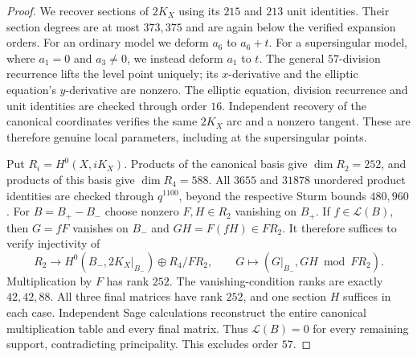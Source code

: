 \begin{proof}
We recover sections of $2K_X$ using its $215$ and $213$ unit
identities. Their section degrees are at most $373,375$ and are
again below the verified expansion orders.
For an ordinary model we deform $a_6$ to $a_6+t$.
For a supersingular model, where $a_1=0$ and $a_3\ne0$, we
instead deform $a_1$ to $t$.
The general $57$-division recurrence lifts the level point
uniquely; its $x$-derivative and the elliptic equation's
$y$-derivative are nonzero.
The elliptic equation, division recurrence and unit identities
are checked through order $16$.
Independent recovery of the canonical coordinates verifies the
same $2K_X$ arc and a nonzero tangent. These are therefore genuine
local parameters, including at the supersingular points.

Put $R_i=H^0(X,iK_X)$. Products of the canonical basis give
$\dim R_2=252$, and products of this basis give $\dim R_4=588$.
All $3655$ and $31878$ unordered product identities are checked
through $q^{1100}$, beyond the respective Sturm bounds $480,960$.
For $B=B_+-B_-$ choose nonzero $F,H\in R_2$ vanishing on $B_+$.
If $f\in\mathcal L(B)$, then $G=fF$ vanishes on $B_-$ and
$GH=F(fH)\in FR_2$.
It therefore suffices to verify injectivity of
\[
 R_2\longrightarrow
 H^0(B_-,2K_X|_{B_-})\oplus R_4/FR_2,
 \qquad G\longmapsto(G|_{B_-},GH\bmod FR_2).
\]
Multiplication by $F$ has rank $252$.
The vanishing-condition ranks are exactly $42,42,88$.
All three final matrices have rank $252$, and one section $H$
suffices in each case. Independent Sage calculations reconstruct
the entire canonical multiplication table and every final matrix.
Thus $\mathcal L(B)=0$ for every remaining support, contradicting
principality. This excludes order $57$.
\end{proof}
